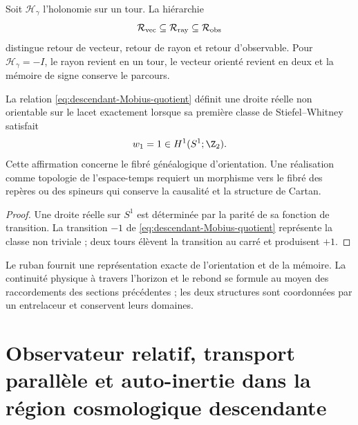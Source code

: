 Soit \(\mathscr H_\gamma\) l'holonomie sur un tour. La hiérarchie
\begin{equation}
 \mathcal R_{\rm vec}
 \subseteq\mathcal R_{\rm ray}
 \subseteq\mathcal R_{\rm obs}
 \label{eq:descendant-return-hierarchy}
\end{equation}
distingue retour de vecteur, retour de rayon et retour d'observable. Pour
\(\mathscr H_\gamma=-I\), le rayon revient en un tour, le vecteur orienté
revient en deux et la mémoire de signe conserve le parcours.

\begin{proposition}
\label{prop:descendant-Mobius-status}
La relation \cref{eq:descendant-Mobius-quotient} définit une droite réelle
non orientable sur le lacet exactement lorsque sa première classe de
Stiefel--Whitney satisfait
\begin{equation}
 w_1=1\in H^1(S^1;\Z_2).
 \label{eq:descendant-w1}
\end{equation}
Cette affirmation concerne le fibré généalogique d'orientation. Une
réalisation comme topologie de l'espace-temps requiert un morphisme vers
le fibré des repères ou des spineurs qui conserve la causalité et la structure de
Cartan.
\end{proposition}

\begin{proof}
Une droite réelle sur \(S^1\) est déterminée par la parité de sa
fonction de transition. La transition \(-1\) de
\cref{eq:descendant-Mobius-quotient} représente la classe non triviale ; deux
tours élèvent la transition au carré et produisent \(+1\).
\end{proof}

Le ruban fournit une représentation exacte de l'orientation et de la mémoire.
La continuité physique à travers l'horizon et le rebond se formule
au moyen des raccordements des sections précédentes ; les deux structures sont
coordonnées par un entrelaceur et conservent leurs domaines.

\section{Observateur relatif, transport parallèle et auto-inertie dans la région cosmologique descendante}

